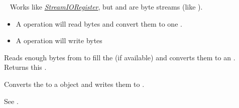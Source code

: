 \documentclass[letterpaper,10pt,english]{sphinxmanual}
\begin{document}
\begin{fulllineitems}
\label{core:py_register_machine2.core.register.BStreamIORegister}~\label{core:bstreamioregister}
Works like {\hyperref[core:streamioregister]{\emph{StreamIORegister}}}, but  and  
are byte streams (like ).
\begin{itemize}
\item {} 
A  operation will read  bytes and convert them to one .

\item {} 
A  operation will write  bytes

\end{itemize}

\begin{fulllineitems}
\label{core:py_register_machine2.core.register.BStreamIORegister.read}
Reads enough bytes from  to fill the  
(if available) and converts them to an . Returns this .

\end{fulllineitems}


\begin{fulllineitems}
\label{core:py_register_machine2.core.register.BStreamIORegister.write}
Converts the   to a  object and writes them to
.

See .

\end{fulllineitems}


\end{fulllineitems}

\end{document}
